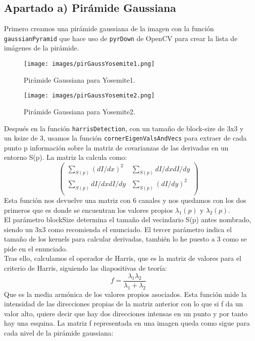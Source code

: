 \documentclass[12pt]{article}
\begin{document}
\subsection*{Apartado a) Pirámide Gaussiana}
Primero creamos una pirámide gaussiana de la imagen con la función \texttt{gaussianPyramid} que hace uso de \texttt{pyrDown} de OpenCV para crear la lista de imágenes de la pirámide.\\
\begin{figure}[H]
\centering
\texttt{[image: images/pirGaussYosemite1.png]} 
\caption{Pirámide Gaussiana para Yosemite1.}
\label{etiqueta}
\end{figure}
\begin{figure}[H]
\centering
\texttt{[image: images/pirGaussYosemite2.png]} 
\caption{Pirámide Gaussiana para Yosemite2.}
\label{etiqueta}
\end{figure}
Después en la función \texttt{harrisDetection}, con un tamaño de block-size de 3x3 y un ksize de 3, usamos la función \texttt{cornerEigenValsAndVecs} para extraer de cada punto p información sobre la matriz de covarianzas de las derivadas en un entorno S(p). La matriz la calcula como:\\
\begin{equation}
\begin{pmatrix}
\sum_{S(p)}(dI/dx)^{2} & \sum_{S(p)}dI/dx dI/dy\\
\sum_{S(p)}dI/dx dI/dy & \sum_{S(p)}(dI/dy)^{2} \\
\end{pmatrix}
\end{equation} 
Esta función nos devuelve una matriz con 6 canales y nos quedamos con los dos primeros que es donde se encuentran los valores propios $\lambda_{1}(p)$ y $\lambda_{2}(p)$.\\
El parámetro blockSize determina el tamaño del vecindario S(p) antes nombrado, siendo un 3x3 como recomienda el enunciado. El tercer parámetro indica el tamaño de los kernels para calcular derivadas, también lo he puesto a 3 como se pide en el enunciado.\\
Tras ello, calculamos el operador de Harris, que es la matriz de valores para el criterio de Harris, siguiendo las diapositivas de teoría:\\
\begin{equation}
f=\frac{\lambda_{1} \lambda_{2}}{\lambda_{1}+\lambda_{2}}
\end{equation}
Que es la media armónica de los valores propios asociados. Esta función mide la intensidad de las direcciones propias de la matriz anterior con lo que si f da un valor alto, quiere decir que hay dos direcciones intensas en un punto y por tanto hay una esquina. La matriz f representada en una imagen queda como sigue para cada nivel de la pirámide gaussiana:\\
\end{document}
